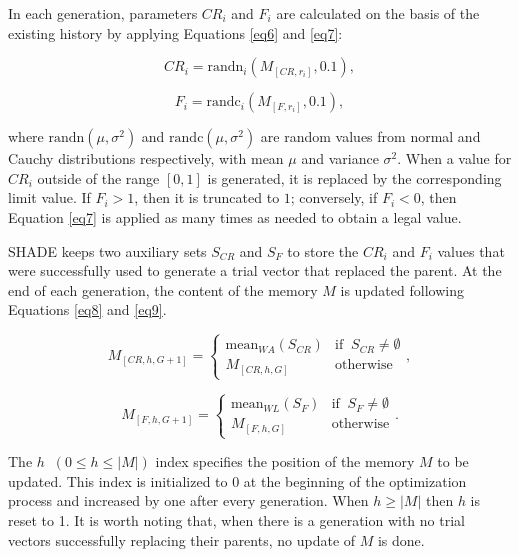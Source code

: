 In each generation, parameters $CR_i$ and $F_i$ are calculated on the basis of the existing history by applying Equations \eqref{eq6} and \eqref{eq7}:

\begin{equation}
CR_i = \text{randn}_i(M_{[CR,r_i]}, 0.1),
\label{eq6}
\end{equation}

\begin{equation}
F_i = \text{randc}_i(M_{[F,r_i]}, 0.1),
\label{eq7}
\end{equation}

\noindent where $\text{randn}(\mu, \sigma^2)$ and $\text{randc}(\mu, \sigma^2)$ are random values from normal and Cauchy distributions respectively, with mean $\mu$ and variance $\sigma^2$. When a value for $CR_i$ outside of the range $[0,1]$ is generated, it is replaced by the corresponding limit value. If $F_i > 1$, then it is truncated to $1$; conversely, if $F_i < 0$, then Equation \eqref{eq7} is applied as many times as needed to obtain a legal value.

\acs{SHADE} keeps two auxiliary sets $S_{CR}$ and $S_F$ to store the $CR_i$ and $F_i$ values that were successfully used to generate a trial vector that replaced the parent. At the end of each generation, the content of the memory $M$ is updated following Equations \eqref{eq8} and \eqref{eq9}.

\begin{equation}
M_{[CR,h,G+1]} = \left\{ \begin{array}{lc}
\text{mean}_{WA} (S_{CR}) & \text{if} \;\; S_{CR} \neq \emptyset \\
M_{[CR,h,G]} &  \text{otherwise}
\end{array}
\right.,
\label{eq8}
\end{equation}

\begin{equation}
M_{[F,h,G+1]} = \left\{ \begin{array}{lc}
\text{mean}_{WL} (S_{F}) & \text{if} \;\; S_{F} \neq \emptyset \\
M_{[F,h,G]} &  \text{otherwise}
\end{array}
\right..
\label{eq9}
\end{equation}

The $h \;\; (0 \le h \le |M|)$ index specifies the position of the memory $M$ to be updated. This index is initialized to $0$ at the beginning of the optimization process and increased by one after every generation. When $h \ge |M|$ then $h$ is reset to 1. It is worth noting that, when there is a generation with no trial vectors successfully replacing their parents, no update of $M$ is done.

